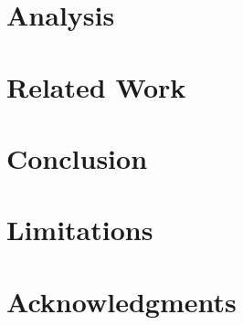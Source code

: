 \documentclass[11pt]{article}
\begin{document}
\section{Analysis}
\label{sec:analysis}


\section{Related Work}
\label{sec:relatedwork}


\section{Conclusion}
\label{sec:conclusions}


\section*{Limitations}

\section*{Acknowledgments}


\appendix


\end{document}
